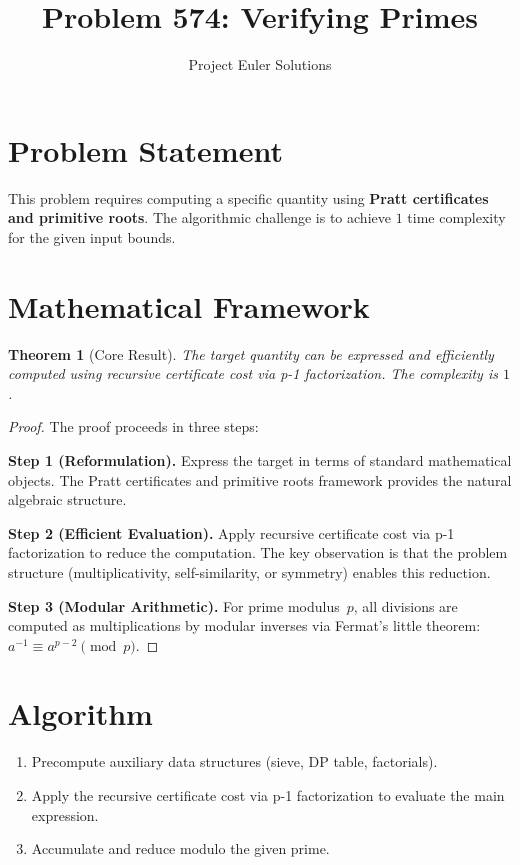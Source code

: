 \documentclass[11pt]{article}
\title{Problem 574: Verifying Primes}
\author{Project Euler Solutions}
\date{}
\newtheorem{theorem}{Theorem}
\begin{document}
\maketitle

\section{Problem Statement}

This problem requires computing a specific quantity using \textbf{Pratt certificates and primitive roots}. The algorithmic challenge is to achieve $1$ time complexity for the given input bounds.

\section{Mathematical Framework}

\begin{theorem}[Core Result]
The target quantity can be expressed and efficiently computed using recursive certificate cost via p-1 factorization. The complexity is $1$.
\end{theorem}

\begin{proof}
The proof proceeds in three steps:

\textbf{Step 1 (Reformulation).} Express the target in terms of standard mathematical objects. The Pratt certificates and primitive roots framework provides the natural algebraic structure.

\textbf{Step 2 (Efficient Evaluation).} Apply recursive certificate cost via p-1 factorization to reduce the computation. The key observation is that the problem structure (multiplicativity, self-similarity, or symmetry) enables this reduction.

\textbf{Step 3 (Modular Arithmetic).} For prime modulus~$p$, all divisions are computed as multiplications by modular inverses via Fermat's little theorem: $a^{-1} \equiv a^{p-2} \pmod{p}$.
\end{proof}

\section{Algorithm}

\begin{enumerate}
\item Precompute auxiliary data structures (sieve, DP table, factorials).
\item Apply the recursive certificate cost via p-1 factorization to evaluate the main expression.
\item Accumulate and reduce modulo the given prime.
\end{enumerate}
\end{document}
